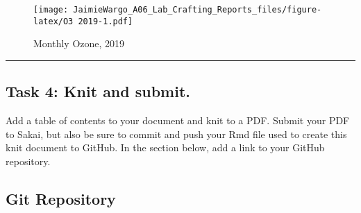 \documentclass[
]{article}
\begin{document}
\begin{figure}
\centering
\texttt{[image: JaimieWargo\_A06\_Lab\_Crafting\_Reports\_files/figure-latex/O3 2019-1.pdf]}
\caption{Monthly Ozone, 2019}
\end{figure}

\begin{center}\rule{0.5\linewidth}{0.5pt}\end{center}

\newpage

\hypertarget{task-4-knit-and-submit.}{%
\subsection{Task 4: Knit and submit.}\label{task-4-knit-and-submit.}}

Add a table of contents to your document and knit to a PDF. Submit your
PDF to Sakai, but also be sure to commit and push your Rmd file used to
create this knit document to GitHub. In the section below, add a link to
your GitHub repository.

\hypertarget{git-repository}{%
\subsection{Git Repository}\label{git-repository}}
\end{document}
